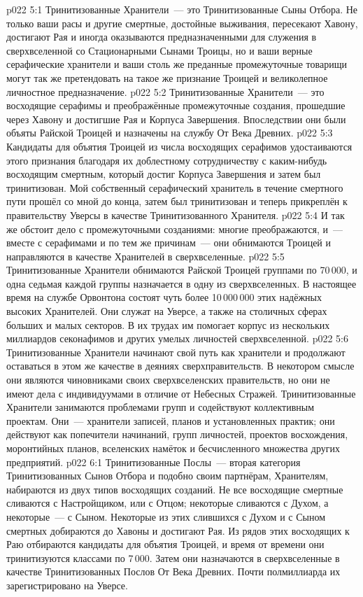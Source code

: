 \vs p022 5:1 Тринитизованные Хранители~--- это Тринитизованные Сыны Отбора. Не только ваши расы и другие смертные, достойные выживания, пересекают Хавону, достигают Рая и иногда оказываются предназначенными для служения в сверхвселенной со Стационарными Сынами Троицы, но и ваши верные серафические хранители и ваши столь же преданные промежуточные товарищи могут так же претендовать на такое же признание Троицей и великолепное личностное предназначение.
\vs p022 5:2 Тринитизованные Хранители~--- это восходящие серафимы и преображённые промежуточные создания, прошедшие через Хавону и достигшие Рая и Корпуса Завершения. Впоследствии они были объяты Райской Троицей и назначены на службу От Века Древних.
\vs p022 5:3 Кандидаты для объятия Троицей из числа восходящих серафимов удостаиваются этого признания благодаря их доблестному сотрудничеству с каким\hyp{}нибудь восходящим смертным, который достиг Корпуса Завершения и затем был тринитизован. Мой собственный серафический хранитель в течение смертного пути прошёл со мной до конца, затем был тринитизован и теперь прикреплён к правительству Уверсы в качестве Тринитизованного Хранителя.
\vs p022 5:4 И так же обстоит дело с промежуточными созданиями: многие преображаются, и~--- вместе с серафимами и по тем же причинам~--- они обнимаются Троицей и направляются в качестве Хранителей в сверхвселенные.
\vs p022 5:5 Тринитизованные Хранители обнимаются Райской Троицей группами по 70\,000, и одна седьмая каждой группы назначается в одну из сверхвселенных. В настоящее время на службе Орвонтона состоят чуть более 10\,000\,000 этих надёжных высоких Хранителей. Они служат на Уверсе, а также на столичных сферах больших и малых секторов. В их трудах им помогает корпус из нескольких миллиардов секонафимов и других умелых личностей сверхвселенной.
\vs p022 5:6 Тринитизованные Хранители начинают свой путь как хранители и продолжают оставаться в этом же качестве в деяниях сверхправительств. В некотором смысле они являются чиновниками своих сверхвселенских правительств, но они не имеют дела с индивидуумами в отличие от Небесных Стражей. Тринитизованные Хранители занимаются проблемами групп и содействуют коллективным проектам. Они~--- хранители записей, планов и установленных практик; они действуют как попечители начинаний, групп личностей, проектов восхождения, моронтийных планов, вселенских намёток и бесчисленного множества других предприятий.
\vs p022 6:1 Тринитизованные Послы~--- вторая категория Тринитизованных Сынов Отбора и подобно своим партнёрам, Хранителям, набираются из двух типов восходящих созданий. Не все восходящие смертные сливаются с Настройщиком, или с Отцом; некоторые сливаются с Духом, а некоторые~--- с Сыном. Некоторые из этих слившихся с Духом и с Сыном смертных добираются до Хавоны и достигают Рая. Из рядов этих восходящих к Раю отбираются кандидаты для объятия Троицей, и время от времени они тринитизуются классами по 7\,000. Затем они назначаются в сверхвселенные в качестве Тринитизованных Послов От Века Древних. Почти полмиллиарда их зарегистрировано на Уверсе.
